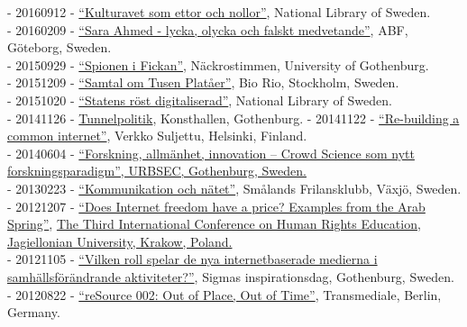 \documentclass[a4paper,11pt,oneside]{article}
\begin{document}
    - 20160912 - \href{http://www.kb.se/aktuellt/utbildningar/2016/Kulturarvet-som-ettor-och-nollor--Del-3-Digital-humaniora/}{``Kulturavet som ettor och nollor''}, National Library of Sweden.\\
    - 20160209 - \href{http://www.abfgoteborg.org/index.php/archive/2016/170-filosofiscenen-2016/2208-sarah-ahmed-lycka-och-falskt-medvetande}{``Sara Ahmed - lycka, olycka och falskt medvetande''}, ABF, Göteborg, Sweden.\\
    - 20150929 - \href{http://hum.gu.se/aktuellt/Nyheter/fulltext//nackrostimmen--spionen-i-fickan-som-overvakar-oss.cid1324880}{``Spionen i Fickan''}, Näckrostimmen, University of Gothenburg.\\
    - 20151209 - \href{http://fhp.nu/tusenplataer}{``Samtal om Tusen Platåer''}, Bio Rio, Stockholm, Sweden.\\
    - 20151020 - \href{http://www.kb.se/aktuellt/evenemang/2015/SOUhack/}{``Statens röst digitaliserad''}, National Library of Sweden. \\
    - 20141126 - \href{http://www.wherevent.com/detail/Goteborgs-Konsthall-TUNNELPOLITIK-Forelasning-med-Christopher-Kullenberg}{Tunnelpolitik}, Konsthallen, Gothenburg.
    - 20141122 - \href{https://www.facebook.com/events/622473101197803/}{``Re-building a common internet''}, Verkko Suljettu, Helsinki, Finland. \\
    - 20140604 - \href{http://www.urbsec.se/digitalAssets/1483/1483366_program-urbsec-konferens-2014-06-04.pdf}{``Forskning, allmänhet, innovation – Crowd Science som nytt forskningsparadigm'', URBSEC, Gothenburg, Sweden.} \\
    - 20130223 - \href{http://www.frilansjournalisten.nu/2013/01/sasong-for-arsmoten/}{``Kommunikation och nätet''}, Smålands Frilansklubb, Växjö, Sweden. \\
    - 20121207 - \href{http://letstudio.gu.se/svenska/aktuellt/nyheter/n/christopher-kullenberg-inbjuden-som-talare-pa-internationell-konferens.cid1111971}{``Does Internet freedom have a price? Examples from the Arab Spring''}, \href{http://www.hre2012.uj.edu.pl/invited-speakers}{The Third International Conference on Human Rights Education, Jagiellonian University, Krakow, Poland.} \\
    - 20121105 - \href{https://www.youtube.com/watch?v=Zo24Qy_PU8I}{``Vilken roll spelar de nya internetbaserade medierna i samhällsförändrande aktiviteter?''}, Sigmas inspirationsdag, Gothenburg, Sweden. \\
    - 20120822 - \href{https://transmediale.de/content/resource-002-out-place-out-time}{``reSource 002: Out of Place, Out of Time''}, Transmediale, Berlin, Germany. \\
\end{document}
